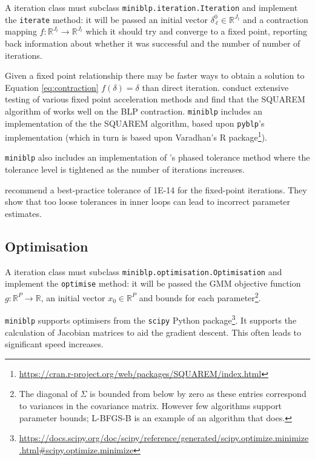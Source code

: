 \documentclass[parskip=half]{scrartcl}
\newcommand{\code}[1]{\texttt{#1}}
\begin{document}
A iteration class must subclass \code{miniblp.iteration.Iteration} and implement the \code{iterate} method: it will be passed an initial vector \(\delta_{\cdot t}^0 \in \mathbb{R}^{J_t}\) and a contraction mapping \(f: \mathbb{R}^{J_t} \to \mathbb{R}^{J_t}\) which it should try and converge to a fixed point, reporting back information about whether it was successful and the number of number of iterations.

Given a fixed point relationship there may be faster ways to obtain a solution to Equation \eqref{eq:contraction} \(f(\delta) = \delta\) than direct iteration.
\cite{reynaerts2012enhancing} conduct extensive testing of various fixed point acceleration methods and find that the SQUAREM algorithm of \cite{varadhan2008simple} works well on the BLP contraction. \code{miniblp} includes an implementation of the the SQUAREM algorithm, based upon \code{pyblp}'s implementation (which in turn is based upon Varadhan's R package\footnote{\url{https://cran.r-project.org/web/packages/SQUAREM/index.html}}).

\code{miniblp} also includes an implementation of \cite{nevo2000practitioner}'s phased tolerance method where the tolerance level is tightened as the number of iterations increases.

\cite{dube2012improving} recommend a best-practice tolerance of 1E-14 for the fixed-point iterations. They show that too loose tolerances in inner loops can lead to incorrect parameter estimates.

\subsection{Optimisation}

A iteration class must subclass \code{miniblp.optimisation.Optimisation} and implement the \code{optimise} method: it will be passed the GMM objective function \(g: \mathbb{R}^P \to \mathbb{R} \), an initial vector \(x_0 \in \mathbb{R}^P\) and bounds for each parameter\footnote{The diagonal of \(\Sigma\) is bounded from below by zero as these entries correspond to variances in the covariance matrix. However few algorithms support parameter bounds; L-BFGS-B is an example of an algorithm that does.}.

\code{miniblp} supports optimisers from the \code{scipy} Python package\footnote{\url{https://docs.scipy.org/doc/scipy/reference/generated/scipy.optimize.minimize.html\#scipy.optimize.minimize}}. It supports the calculation of Jacobian matrices to aid the gradient descent. This often leads to significant speed increases.
\end{document}
